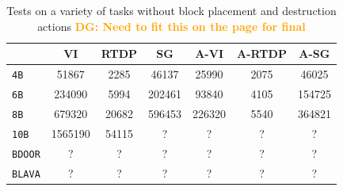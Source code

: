 \documentclass[]{article}
\newcommand{\dgnote}[1]{\textcolor{Orange}{\textbf{DG: #1}}}
\begin{document}
%
%



\begin{table}
\centering
\begin{tabular}{ l || c | c | c | c | c | c }
  & VI & RTDP & SG & A-VI & A-RTDP & A-SG \\
  \hline
  \texttt{4B} 		&	51867 		& 2285 	&	46137 		& 25990  		& 2075 	& 46025  \\
  \texttt{6B} 		&	234090 	 	& 5994 	& 	202461 		& 93840  		& 4105 	& 154725  \\
  \texttt{8B} 		&	679320 	 	& 20682 	&	596453 		& 226320		& 5540 	& 364821  \\
  \texttt{10B} 		&	1565190 	 	& 54115 	&	?	 		& ?	 		& ?  		& ?\\
  \texttt{BDOOR} 	&	? 	 		& ? 		&	? 			& ?	 		& ?  		& ?\\
  \texttt{BLAVA}  	&	? 	 		& ? 		&	? 			& ?	 		& ?  		& ?\\
\end{tabular} 
\label{results_main}
\caption{Tests on a variety of tasks without block placement and destruction actions \dgnote{Need to fit this on the page for final}}
\end{table}
\end{document}

